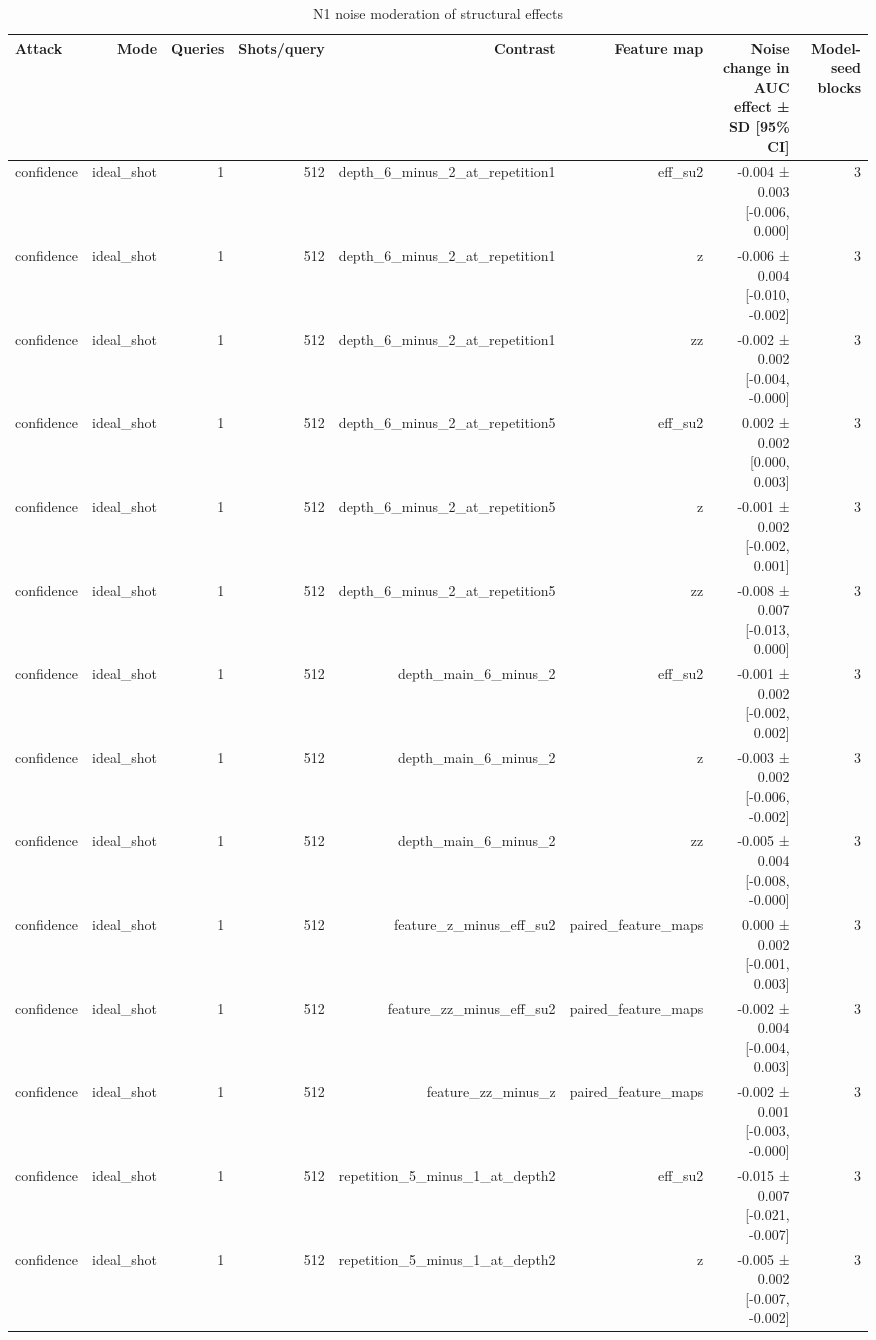 \begin{table}
\caption{N1 noise moderation of structural effects}
\label{tab:satml_noise_n1_moderation}
\begin{tabular}{lrrrrrrr}
\toprule
Attack & Mode & Queries & Shots/query & Contrast & Feature map & Noise change in AUC effect ± SD [95\% CI] & Model-seed blocks \\
\midrule
confidence & ideal\_shot & 1 & 512 & depth\_6\_minus\_2\_at\_repetition1 & eff\_su2 & -0.004 ± 0.003 [-0.006, 0.000] & 3 \\
confidence & ideal\_shot & 1 & 512 & depth\_6\_minus\_2\_at\_repetition1 & z & -0.006 ± 0.004 [-0.010, -0.002] & 3 \\
confidence & ideal\_shot & 1 & 512 & depth\_6\_minus\_2\_at\_repetition1 & zz & -0.002 ± 0.002 [-0.004, -0.000] & 3 \\
confidence & ideal\_shot & 1 & 512 & depth\_6\_minus\_2\_at\_repetition5 & eff\_su2 & 0.002 ± 0.002 [0.000, 0.003] & 3 \\
confidence & ideal\_shot & 1 & 512 & depth\_6\_minus\_2\_at\_repetition5 & z & -0.001 ± 0.002 [-0.002, 0.001] & 3 \\
confidence & ideal\_shot & 1 & 512 & depth\_6\_minus\_2\_at\_repetition5 & zz & -0.008 ± 0.007 [-0.013, 0.000] & 3 \\
confidence & ideal\_shot & 1 & 512 & depth\_main\_6\_minus\_2 & eff\_su2 & -0.001 ± 0.002 [-0.002, 0.002] & 3 \\
confidence & ideal\_shot & 1 & 512 & depth\_main\_6\_minus\_2 & z & -0.003 ± 0.002 [-0.006, -0.002] & 3 \\
confidence & ideal\_shot & 1 & 512 & depth\_main\_6\_minus\_2 & zz & -0.005 ± 0.004 [-0.008, -0.000] & 3 \\
confidence & ideal\_shot & 1 & 512 & feature\_z\_minus\_eff\_su2 & paired\_feature\_maps & 0.000 ± 0.002 [-0.001, 0.003] & 3 \\
confidence & ideal\_shot & 1 & 512 & feature\_zz\_minus\_eff\_su2 & paired\_feature\_maps & -0.002 ± 0.004 [-0.004, 0.003] & 3 \\
confidence & ideal\_shot & 1 & 512 & feature\_zz\_minus\_z & paired\_feature\_maps & -0.002 ± 0.001 [-0.003, -0.000] & 3 \\
confidence & ideal\_shot & 1 & 512 & repetition\_5\_minus\_1\_at\_depth2 & eff\_su2 & -0.015 ± 0.007 [-0.021, -0.007] & 3 \\
confidence & ideal\_shot & 1 & 512 & repetition\_5\_minus\_1\_at\_depth2 & z & -0.005 ± 0.002 [-0.007, -0.002] & 3 \\

\end{tabular}
\end{table}
